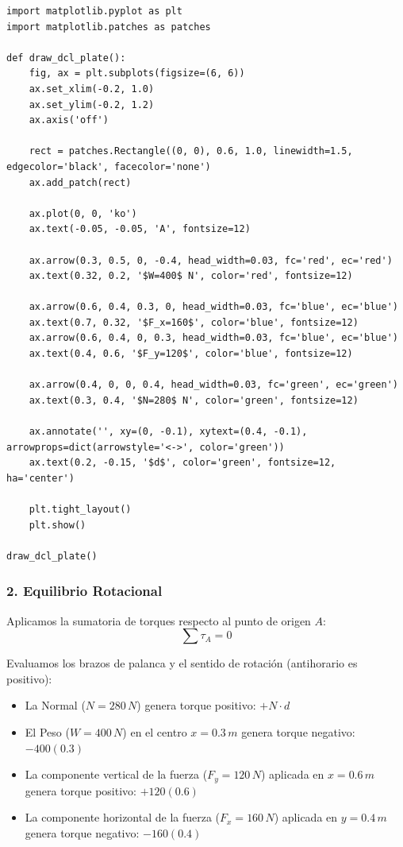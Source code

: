 \documentclass[12pt, a4paper]{article}
\begin{document}
\begin{lstlisting}
import matplotlib.pyplot as plt
import matplotlib.patches as patches

def draw_dcl_plate():
    fig, ax = plt.subplots(figsize=(6, 6))
    ax.set_xlim(-0.2, 1.0)
    ax.set_ylim(-0.2, 1.2)
    ax.axis('off')

    rect = patches.Rectangle((0, 0), 0.6, 1.0, linewidth=1.5, edgecolor='black', facecolor='none')
    ax.add_patch(rect)

    ax.plot(0, 0, 'ko')
    ax.text(-0.05, -0.05, 'A', fontsize=12)

    ax.arrow(0.3, 0.5, 0, -0.4, head_width=0.03, fc='red', ec='red')
    ax.text(0.32, 0.2, '$W=400$ N', color='red', fontsize=12)

    ax.arrow(0.6, 0.4, 0.3, 0, head_width=0.03, fc='blue', ec='blue')
    ax.text(0.7, 0.32, '$F_x=160$', color='blue', fontsize=12)
    ax.arrow(0.6, 0.4, 0, 0.3, head_width=0.03, fc='blue', ec='blue')
    ax.text(0.4, 0.6, '$F_y=120$', color='blue', fontsize=12)

    ax.arrow(0.4, 0, 0, 0.4, head_width=0.03, fc='green', ec='green')
    ax.text(0.3, 0.4, '$N=280$ N', color='green', fontsize=12)

    ax.annotate('', xy=(0, -0.1), xytext=(0.4, -0.1), arrowprops=dict(arrowstyle='<->', color='green'))
    ax.text(0.2, -0.15, '$d$', color='green', fontsize=12, ha='center')

    plt.tight_layout()
    plt.show()

draw_dcl_plate()
\end{lstlisting}

\subsubsection*{2. Equilibrio Rotacional}
Aplicamos la sumatoria de torques respecto al punto de origen $A$:
$$\sum \tau_A = 0$$

Evaluamos los brazos de palanca y el sentido de rotación (antihorario es positivo):
\begin{itemize}
    \item La Normal ($N=280 \, \si{N}$) genera torque positivo: $+ N \cdot d$
    \item El Peso ($W=400 \, \si{N}$) en el centro $x=0.3 \, \si{m}$ genera torque negativo: $- 400(0.3)$
    \item La componente vertical de la fuerza ($F_y=120 \, \si{N}$) aplicada en $x=0.6 \, \si{m}$ genera torque positivo: $+ 120(0.6)$
    \item La componente horizontal de la fuerza ($F_x=160 \, \si{N}$) aplicada en $y=0.4 \, \si{m}$ genera torque negativo: $- 160(0.4)$
\end{itemize}
\end{document}
